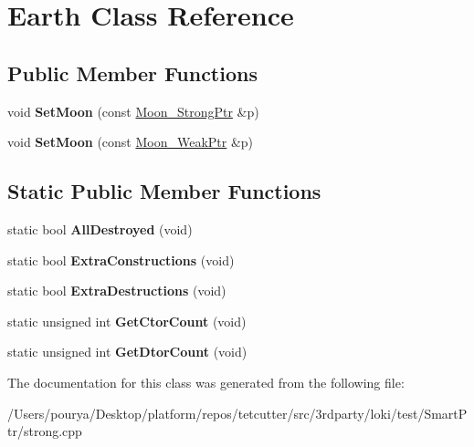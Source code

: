 \hypertarget{classEarth}{}\section{Earth Class Reference}
\label{classEarth}
\subsection*{Public Member Functions}
\begin{DoxyCompactItemize}
\item 
\hypertarget{classEarth_aae136774a238d0470f57996c3326f9d9}{}void {\bfseries Set\+Moon} (const \hyperlink{classLoki_1_1StrongPtr}{Moon\+\_\+\+Strong\+Ptr} \&p)\label{classEarth_aae136774a238d0470f57996c3326f9d9}

\item 
\hypertarget{classEarth_a05b151f8140bfd4d08a8c19b9ff99315}{}void {\bfseries Set\+Moon} (const \hyperlink{classLoki_1_1StrongPtr}{Moon\+\_\+\+Weak\+Ptr} \&p)\label{classEarth_a05b151f8140bfd4d08a8c19b9ff99315}

\end{DoxyCompactItemize}
\subsection*{Static Public Member Functions}
\begin{DoxyCompactItemize}
\item 
\hypertarget{classEarth_a499a81aa692ff1a22f6695793ada09af}{}static bool {\bfseries All\+Destroyed} (void)\label{classEarth_a499a81aa692ff1a22f6695793ada09af}

\item 
\hypertarget{classEarth_aa7b959e79979ebdf2c9b4ba61011ed93}{}static bool {\bfseries Extra\+Constructions} (void)\label{classEarth_aa7b959e79979ebdf2c9b4ba61011ed93}

\item 
\hypertarget{classEarth_ae0f8b350fe57ef139bc18577bf49bb92}{}static bool {\bfseries Extra\+Destructions} (void)\label{classEarth_ae0f8b350fe57ef139bc18577bf49bb92}

\item 
\hypertarget{classEarth_ac7b32d19ada7c8a3787bb8e631f7ed70}{}static unsigned int {\bfseries Get\+Ctor\+Count} (void)\label{classEarth_ac7b32d19ada7c8a3787bb8e631f7ed70}

\item 
\hypertarget{classEarth_ae892ec764fdb782e4afc5c174bb93f17}{}static unsigned int {\bfseries Get\+Dtor\+Count} (void)\label{classEarth_ae892ec764fdb782e4afc5c174bb93f17}

\end{DoxyCompactItemize}


The documentation for this class was generated from the following file\+:\begin{DoxyCompactItemize}
\item 
/\+Users/pourya/\+Desktop/platform/repos/tetcutter/src/3rdparty/loki/test/\+Smart\+Ptr/strong.\+cpp\end{DoxyCompactItemize}
